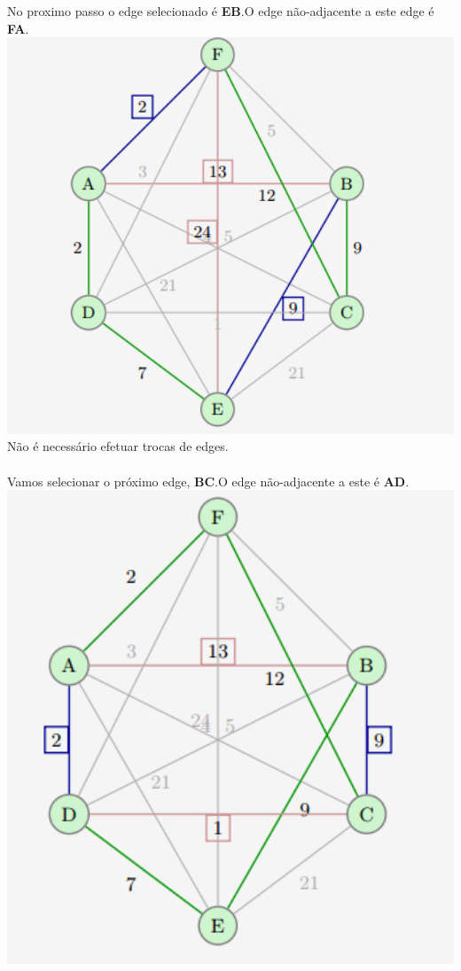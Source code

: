 \documentclass[12pt,a4paper,portrait]{article}
\begin{document}
			\newpage
			No proximo passo o edge selecionado é \textbf{EB}.O edge não-adjacente a este edge é \textbf{FA}.\\
			\includegraphics[width=1.0\textwidth]{imagens/5}
			Não é necessário efetuar trocas de edges.\\\\
			\newpage
			Vamos selecionar o próximo edge, \textbf{BC}.O edge não-adjacente a este é \textbf{AD}.
			\includegraphics[width=1.0\textwidth]{imagens/6}
\end{document}
